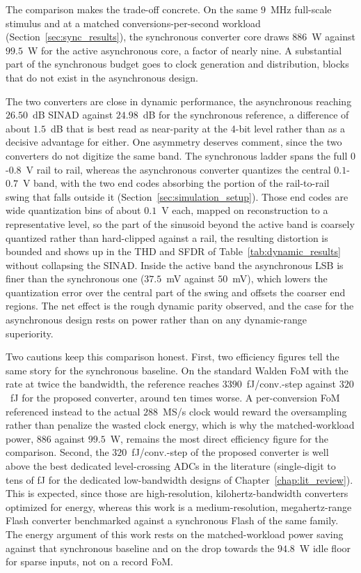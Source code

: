 The comparison makes the trade-off concrete. On the same $9$~MHz full-scale stimulus and at a matched conversions-per-second workload (Section~\ref{sec:sync_results}), the synchronous converter core draws $886$~\textmu W against $99.5$~\textmu W for the active asynchronous core, a factor of nearly nine. A substantial part of the synchronous budget goes to clock generation and distribution, blocks that do not exist in the asynchronous design.

The two converters are close in dynamic performance, the asynchronous reaching $26.50$~dB SINAD against $24.98$~dB for the synchronous reference, a difference of about $1.5$~dB that is best read as near-parity at the 4-bit level rather than as a decisive advantage for either. One asymmetry deserves comment, since the two converters do not digitize the same band. The synchronous ladder spans the full $0$-$0.8$~V rail to rail, whereas the asynchronous converter quantizes the central $0.1$-$0.7$~V band, with the two end codes absorbing the portion of the rail-to-rail swing that falls outside it (Section~\ref{sec:simulation_setup}). Those end codes are wide quantization bins of about $0.1$~V each, mapped on reconstruction to a representative level, so the part of the sinusoid beyond the active band is coarsely quantized rather than hard-clipped against a rail, the resulting distortion is bounded and shows up in the THD and SFDR of Table~\ref{tab:dynamic_results} without collapsing the SINAD. Inside the active band the asynchronous LSB is finer than the synchronous one ($37.5$~mV against $50$~mV), which lowers the quantization error over the central part of the swing and offsets the coarser end regions. The net effect is the rough dynamic parity observed, and the case for the asynchronous design rests on power rather than on any dynamic-range superiority.

Two cautions keep this comparison honest. First, two efficiency figures tell the same story for the synchronous baseline. On the standard Walden FoM with the rate at twice the bandwidth, the reference reaches $3390$~fJ/conv.-step against $320$~fJ for the proposed converter, around ten times worse. A per-conversion FoM referenced instead to the actual $288$~MS/s clock would reward the oversampling rather than penalize the wasted clock energy, which is why the matched-workload power, $886$ against $99.5$~\textmu W, remains the most direct efficiency figure for the comparison. Second, the $320$~fJ/conv.-step of the proposed converter is well above the best dedicated level-crossing ADCs in the literature (single-digit to tens of fJ for the dedicated low-bandwidth designs of Chapter~\ref{chap:lit_review}). This is expected, since those are high-resolution, kilohertz-bandwidth converters optimized for energy, whereas this work is a medium-resolution, megahertz-range Flash converter benchmarked against a synchronous Flash of the same family. The energy argument of this work rests on the matched-workload power saving against that synchronous baseline and on the drop towards the $94.8$~\textmu W idle floor for sparse inputs, not on a record FoM.

